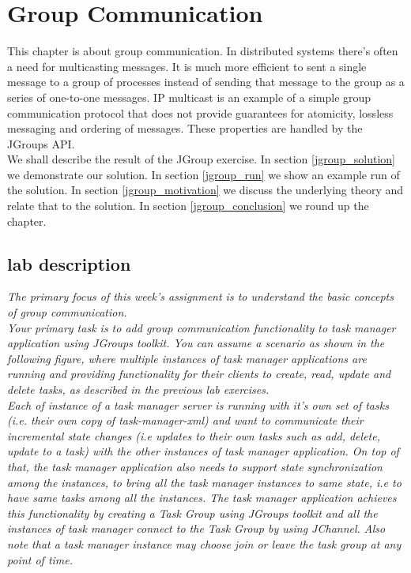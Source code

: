 \chapter{Group Communication}
\minitoc


This chapter is about group communication. In distributed systems there's often a need for multicasting messages. It is much more efficient to sent a single message to a group of processes instead of sending that message to the group as a series of one-to-one messages. IP multicast is an example of a simple group communication protocol that does not provide guarantees for atomicity, lossless messaging and ordering of messages. These properties are handled by the JGroups API.  \\

We shall describe the result of the JGroup exercise. In section \ref{jgroup_solution} we demonstrate our solution. In section \ref{jgroup_run} we show an example run of the solution. In section \ref{jgroup_motivation} we discuss the underlying theory and relate that to the solution. In section \ref{jgroup_conclusion} we round up the chapter.


\section{lab description}

\textit{The primary focus of this week’s assignment is to understand the basic concepts of group communication.} \\

\textit{Your primary task is to add group communication functionality to task manager application using JGroups toolkit. You can assume a scenario as shown in the following figure, where multiple instances of task manager applications are running and providing functionality for their clients to create, read, update and delete tasks, as described in the previous lab exercises.}\\

\textit{Each of instance of a task manager server is running with it’s own set of tasks (i.e. their own copy of task-manager-xml) and want to communicate their incremental state changes (i.e updates to their own tasks such as add, delete, update to a task) with the other instances of task manager application.  On top of that, the task manager application also needs to support state synchronization among the instances, to bring all the task manager instances to same state, i.e to have same tasks among all the instances. The task manager application  achieves this functionality by creating a Task Group using JGroups toolkit and all the instances of task manager connect to the Task Group by using JChannel. Also note that a task manager instance may choose join or leave the task group at any point of time.}\\

